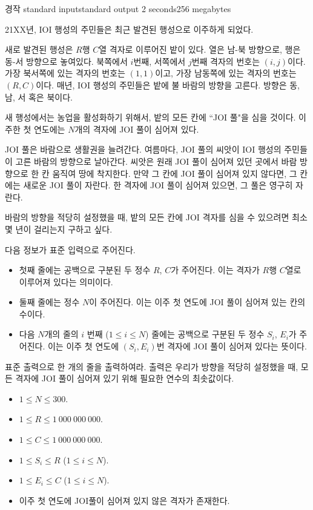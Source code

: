 \begin{problem}{경작}
	{standard input}{standard output}
	{2 seconds}{256 megabytes}{}
	
	21XX년, IOI 행성의 주민들은 최근 발견된 행성으로 이주하게 되었다.
	
	새로 발견된 행성은 $R$행 $C$열 격자로 이루어진 밭이 있다. 열은 남-북 방향으로, 행은 동-서 방향으로 놓여있다. 북쪽에서 $i$번째, 서쪽에서 $j$번째 격자의 번호는 $(i, j)$이다. 가장 북서쪽에 있는 격자의 번호는 $(1, 1)$이고, 가장 남동쪽에 있는 격자의 번호는 $(R, C)$이다. 매년, IOI 행성의 주민들은 밭에 불 바람의 방향을 고른다. 방향은 동, 남, 서 혹은 북이다.
	
	새 행성에서는 농업을 활성화하기 위해서, 밭의 모든 칸에 ``JOI 풀"을 심을 것이다. 이주한 첫 연도에는 $N$개의 격자에 JOI 풀이 심어져 있다.
	
	JOI 풀은 바람으로 생활권을 늘려간다. 여름마다, JOI 풀의 씨앗이 IOI 행성의 주민들이 고른 바람의 방향으로 날아간다. 씨앗은 원래 JOI 풀이 심어져 있던 곳에서 바람 방향으로 한 칸 움직여 땅에 착지한다. 만약 그 칸에 JOI 풀이 심어져 있지 않다면, 그 칸에는 새로운 JOI 풀이 자란다. 한 격자에 JOI 풀이 심어져 있으면, 그 풀은 영구히 자란다.
	
	바람의 방향을 적당히 설정했을 때, 밭의 모든 칸에 JOI 격자를 심을 수 있으려면 최소 몇 년이 걸리는지 구하고 싶다.
	

	\InputFile
	
	다음 정보가 표준 입력으로 주어진다.
	
	\begin{itemize}
		\item 첫째 줄에는 공백으로 구분된 두 정수 $R$, $C$가 주어진다. 이는 격자가 $R$행 $C$열로 이루어져 있다는 의미이다.
		\item 둘째 줄에는 정수 $N$이 주어진다. 이는 이주 첫 연도에 JOI 풀이 심어져 있는 칸의 수이다.
		\item 다음 $N$개의 줄의 $i$ 번째 ($1 \le i \le N$) 줄에는 공백으로 구분된 두 정수 $S_i$, $E_i$가 주어진다. 이는 이주 첫 연도에 $(S_i, E_i)$번 격자에 JOI 풀이 심어져 있다는 뜻이다.
	\end{itemize}

	
	\OutputFile
	
	표준 출력으로 한 개의 줄을 출력하여라. 출력은 우리가 방향을 적당히 설정했을 때, 모든 격자에 JOI 풀이 심어져 있기 위해 필요한 연수의 최솟값이다.
	
	\Constraints
	
	\begin{itemize}
	
	\item $1 \le N \le 300$.
	\item $1 \le R \le 1\ 000\ 000\ 000$.
	\item $1 \le C \le 1\ 000\ 000\ 000$.
	\item $1 \le S_i \le R$ ($1 \le i \le N$).
	\item $1 \le E_i \le C$ ($1 \le i \le N$).
	\item 이주 첫 연도에 JOI풀이 심어져 있지 않은 격자가 존재한다.		
	\end{itemize}
	

\end{problem}

